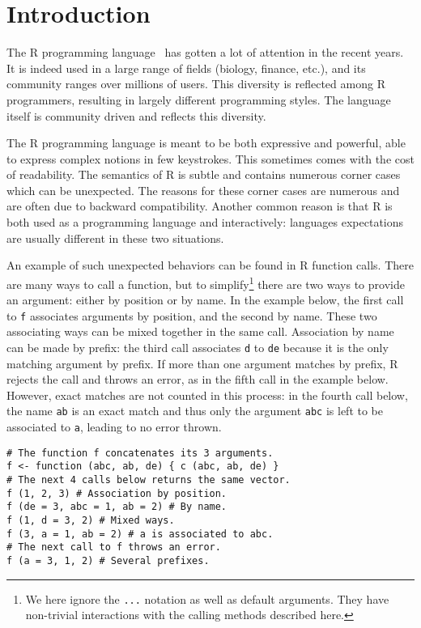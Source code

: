 \documentclass[
    sigplan,
    10pt,
    review, %
    natbib=false %
 ]{acmart}
\begin{document}

\maketitle

\section{Introduction}
\label{sec:intro}

The R programming language~\parencite{R, ihaka1996r, Rwebsite}
has gotten a lot of attention in the recent years.
It is indeed used in a large range of fields (biology, finance, etc.),
and its community ranges over millions of users.
This diversity is reflected among R programmers,
resulting in largely different programming styles.
The language itself is community driven and reflects this diversity.

The R programming language is meant to be both expressive and powerful,
able to express complex notions in few keystrokes.
This sometimes comes with the cost of readability.
The semantics of R is subtle and contains numerous corner cases
which can be unexpected.
The reasons for these corner cases are numerous
and are often due to backward compatibility.
Another common reason is that R
is both used as a programming language and interactively:
languages expectations are usually different in these two situations.

An example of such unexpected behaviors can be found
in R function calls.
There are many ways to call a function,
but to simplify\footnote{
    We here ignore the \texttt{...} notation
    as well as default arguments.
    They have non-trivial interactions with the calling methods
    described here.
} there are two ways to provide an argument:
either by position or by name.
In the example below, the first call to \texttt{f}
associates arguments by position, and the second by name.
These two associating ways can be mixed together in the same call.
%
Association by name can be made by prefix:
the third call associates \texttt{d} to \texttt{de}
because it is the only matching argument by prefix.
If more than one argument matches by prefix,
R rejects the call and throws an error,
as in the fifth call in the example below.
However, exact matches are not counted in this process:
in the fourth call below,
the name \texttt{ab} is an exact match
and thus only the argument \texttt{abc}
is left to be associated to \texttt{a},
leading to no error thrown.
\begin{verbatim}
# The function f concatenates its 3 arguments.
f <- function (abc, ab, de) { c (abc, ab, de) }
# The next 4 calls below returns the same vector.
f (1, 2, 3) # Association by position.
f (de = 3, abc = 1, ab = 2) # By name.
f (1, d = 3, 2) # Mixed ways.
f (3, a = 1, ab = 2) # a is associated to abc.
# The next call to f throws an error.
f (a = 3, 1, 2) # Several prefixes.
\end{verbatim}
\end{document}
